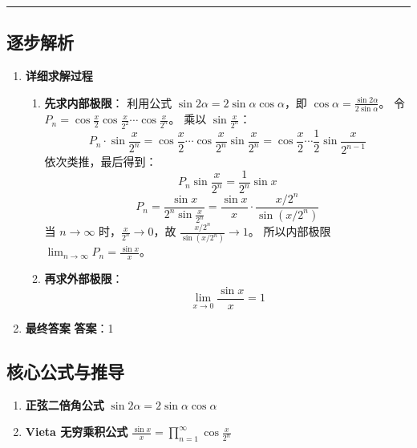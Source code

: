 \documentclass[UTF8]{ctexart}
\newenvironment{redenv}{\color{red}}{}
\newenvironment{detailedanalysis}{%
    \color{red}
    \begin{enumerate}[label=\textbf{第\arabic*步：}, leftmargin=*, align=left, itemsep=1.5ex]
}{%
    \end{enumerate}
}
\newenvironment{formuladerivation}{%
    \begin{enumerate}[label={\textbf{公式\arabic*：}}, leftmargin=*, align=left]
}{%
    \end{enumerate}
}
\newcommand{\analysisrule}{\noindent\rule{\textwidth}{0.8pt}\vspace{-0.8em}}
\begin{document}
\begin{redenv}
\analysisrule
\subsection*{逐步解析}

\begin{detailedanalysis}
\item \textbf{详细求解过程}
\begin{enumerate}[label=(\arabic*)]
\item \textbf{先求内部极限}：
利用公式 $\sin 2\alpha = 2\sin\alpha\cos\alpha$，即 $\cos\alpha = \frac{\sin 2\alpha}{2\sin\alpha}$。
令 $P_n = \cos\frac{x}{2}\cos\frac{x}{2^2}\cdots \cos\frac{x}{2^n}$。
乘以 $\sin\frac{x}{2^n}$：
$$ P_n \cdot \sin\frac{x}{2^n} = \cos\frac{x}{2}\cdots \cos\frac{x}{2^n} \sin\frac{x}{2^n} = \cos\frac{x}{2}\cdots \frac{1}{2}\sin\frac{x}{2^{n-1}} $$
依次类推，最后得到：
$$ P_n \sin\frac{x}{2^n} = \frac{1}{2^n} \sin x $$
$$ P_n = \frac{\sin x}{2^n \sin\frac{x}{2^n}} = \frac{\sin x}{x} \cdot \frac{x/2^n}{\sin(x/2^n)} $$
当 $n \to \infty$ 时，$\frac{x}{2^n} \to 0$，故 $\frac{x/2^n}{\sin(x/2^n)} \to 1$。
所以内部极限 $\lim_{n \to \infty} P_n = \frac{\sin x}{x}$。

\item \textbf{再求外部极限}：
$$ \lim_{x \to 0} \frac{\sin x}{x} = 1 $$
\end{enumerate}

\item \textbf{最终答案}
\textbf{答案}：1
\end{detailedanalysis}

\subsection*{核心公式与推导}
\begin{formuladerivation}
\item \textbf{正弦二倍角公式}
$\sin 2\alpha = 2\sin \alpha \cos \alpha$
\item \textbf{Vieta 无穷乘积公式}
$\frac{\sin x}{x} = \prod_{n=1}^{\infty} \cos\frac{x}{2^n}$
\end{formuladerivation}
\end{redenv}
\end{document}
